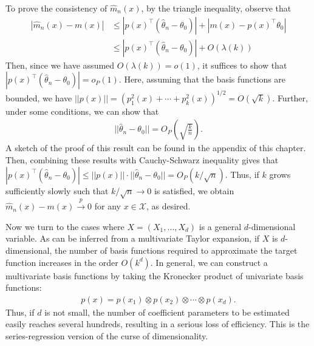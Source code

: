 \documentclass[11pt, A4paper, openany, uplatex]{book}
\begin{document}
To prove the consistency of $\hat m_n(x)$, by the triangle inequality, observe that
\begin{align*}
	|\hat m_n(x) - m(x)|
	& \le |p(x)^\top (\hat \theta_n - \theta_0)| + |m(x) - p(x)^\top \theta_0| \\
	& \le |p(x)^\top (\hat \theta_n - \theta_0)| + O(\lambda(k))
\end{align*}
Then, since we have assumed $O(\lambda(k)) = o(1)$, it suffices to show that $|p(x)^\top (\hat \theta_n - \theta_0)| = o_P(1)$.
Here, assuming that the basis functions are bounded, we have $||p(x)|| = (p_1^2(x) + \cdots + p_k^2(x))^{1/2} = O(\sqrt{k})$.
Further, under some conditions, we can show that
\begin{align}\label{eq:seriesrate}
		||\hat \theta_n - \theta_0|| = O_P\left( \sqrt{\frac{k}{n}} \right).
\end{align}
A sketch of the proof of this result can be found in the appendix of this chapter.
Then, combining these results with Cauchy-Schwarz inequality gives that $|p(x)^\top (\hat \theta_n - \theta_0)| \le ||p(x)|| \cdot ||\hat \theta_n - \theta_0 || = O_P(k/\sqrt{n})$.
Thus, if $k$ grows sufficiently slowly such that $k/\sqrt{n} \to 0$ is satisfied, we obtain $\hat m_n(x) - m(x) \overset{p}{\to} 0$ for any $x \in \mathcal{X}$, as desired.

\begin{comment}
To prove the asymptotic normality, we require much stronger conditions.
Here, we only state the result under the homoskedasticity assumption $\E[\eps^2 \mid X] = \sigma^2$: for a given $x \in \mathcal{X}$,
\begin{align*}
	\frac{\sqrt{n}(\hat m_n(x) - m(x))}{\sigma \sqrt{p(x)^\top \E[p(X)p(X)^\top]^{-1}p(x)}} \overset{d}{\to} N(0,1).
\end{align*}
Then, based on this result, we can compute the confidence interval for each $m(x)$.
\end{comment}

\bigskip

Now we turn to the cases where $X = (X_1, \ldots, X_d)$ is a general $d$-dimensional variable.
As can be inferred from a multivariate Taylor expansion, if $X$ is $d$-dimensional, the number of basis functions required to approximate the target function increases in the order $O(k^d)$.
In general, we can construct a multivariate basis functions by taking the Kronecker product of univariate basis functions:
\begin{align*}
	p(x) = p(x_1) \otimes p(x_2) \otimes \cdots \otimes p(x_d).
\end{align*}
Thus, if $d$ is not small, the number of coefficient parameters to be estimated easily reaches several hundreds, resulting in a serious loss of efficiency.
This is the series-regression version of the curse of dimensionality.
\end{document}
